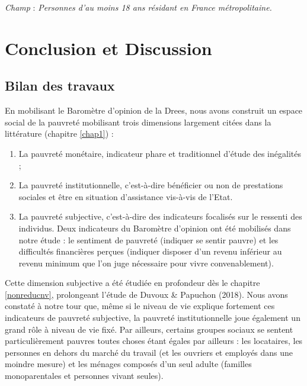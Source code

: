 \documentclass[12pt,a4paper]{reedthesis}
\begin{document}
\emph{Champ} : \emph{Personnes d’au moins 18 ans résidant en France métropolitaine.}
\normalsize

\hypertarget{conclusion-et-discussion}{%
\chapter*{Conclusion et Discussion}\label{conclusion-et-discussion}}

\hypertarget{bilan-des-travaux}{%
\section*{Bilan des travaux}\label{bilan-des-travaux}}

En mobilisant le Baromètre d'opinion de la Drees, nous avons construit un espace social de la pauvreté mobilisant trois dimensions largement citées dans la littérature (chapitre \ref{chap1}) :
\begin{enumerate}
\def\labelenumi{\arabic{enumi}.}
\item
  La pauvreté monétaire, indicateur phare et traditionnel d'étude des inégalités ;
\item
  La pauvreté institutionnelle, c'est-à-dire bénéficier ou non de prestations sociales et être en situation d'assistance vis-à-vis de l'Etat.
\item
  La pauvreté subjective, c'est-à-dire des indicateurs focalisés sur le ressenti des individus. Deux indicateurs du Baromètre d'opinion ont été mobilisés dans notre étude : le sentiment de pauvreté (indiquer se sentir pauvre) et les difficultés financières perçues (indiquer disposer d'un revenu inférieur au revenu minimum que l'on juge nécessaire pour vivre convenablement).
\end{enumerate}
Cette dimension subjective a été étudiée en profondeur dès le chapitre \ref{nonreducnv}, prolongeant l'étude de Duvoux \& Papuchon (2018). Nous avons constaté à notre tour que, même si le niveau de vie explique fortement ces indicateurs de pauvreté subjective, la pauvreté institutionnelle joue également un grand rôle à niveau de vie fixé. Par ailleurs, certains groupes sociaux se sentent particulièrement pauvres toutes choses étant égales par ailleurs : les locataires, les personnes en dehors du marché du travail (et les ouvriers et employés dans une moindre mesure) et les ménages composés d'un seul adulte (familles monoparentales et personnes vivant seules).
\end{document}
